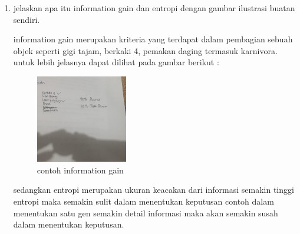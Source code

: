 \begin{enumerate}
\item jelaskan apa itu information gain dan entropi dengan gambar ilustrasi buatan sendiri.\par
information gain merupakan kriteria yang terdapat dalam pembagian sebuah objek seperti gigi tajam, berkaki 4, pemakan daging termasuk karnivora. untuk lebih jelasnya dapat dilihat pada gambar berikut :\par
\begin{figure}[H]
\centering
\includegraphics[width= 4cm]{figures/1174039/chapter2/9.jpeg}
\caption{contoh information gain}

\end{figure}
sedangkan entropi merupakan ukuran keacakan dari informasi semakin tinggi entropi maka semakin sulit dalam menentukan keputusan contoh dalam menentukan satu gen semakin detail informasi maka akan semakin susah dalam menentukan keputusan.
\end{enumerate}



